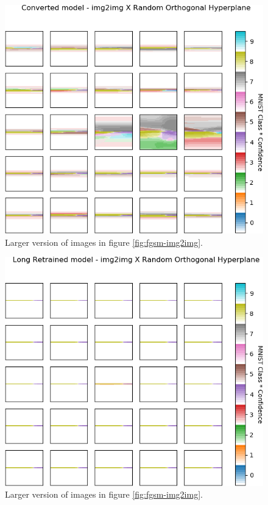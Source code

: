 \documentclass[12pt,oneside]{CUNY_PhD}
\begin{document}
\begin{figure}
    \centering
    \includegraphics[width=\textwidth]{images/observations/converted-img8toimg4.png}
    \caption*{Larger version of images in figure \ref{fig:fgsm-img2img}.}
\end{figure}
\begin{figure}
    \centering
    \includegraphics[width=\textwidth]{images/observations/long-img8toimg4.png}
    \caption*{Larger version of images in figure \ref{fig:fgsm-img2img}.}
\end{figure}
\end{document}
